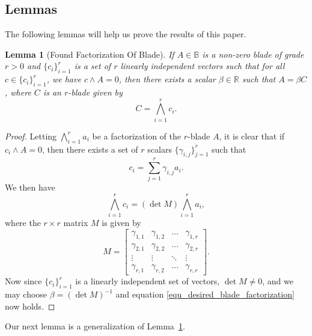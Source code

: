 \documentclass{birkjour}
\newtheorem{lem}[thm]{Lemma}
\theoremstyle{definition}
\theoremstyle{remark}
\numberwithin{equation}{section}
\newcommand{\R}{\mathbb{R}}
\newcommand{\B}{\mathbb{B}}
\begin{document}
\subsection{Lemmas}

The following lemmas will help us prove the results of this paper.

\begin{lem}[Found Factorization Of Blade]\label{lem_desired_blade_factorization}
If $A\in\B$ is a non-zero blade of grade $r>0$ and $\{c_i\}_{i=1}^r$ is a set
of $r$ linearly independent vectors such that for all $c\in\{c_i\}_{i=1}^r$, we have
$c\wedge A=0$, then there exists a scalar $\beta\in\R$ such that $A=\beta C$,
where $C$ is an $r$-blade given by
\begin{equation}\label{equ_desired_blade_factorization}
C=\bigwedge_{i=1}^r c_i.
\end{equation}
\end{lem}
\begin{proof}
Letting $\bigwedge_{i=1}^r a_i$ be a factorization of the $r$-blade $A$, it is clear
that if $c_i\wedge A=0$, then there exists a set of $r$ scalars $\{\gamma_{i,j}\}_{j=1}^r$
such that
\begin{equation}\label{equ_c_i}
c_i=\sum_{j=1}^r\gamma_{i,j}a_i.
\end{equation}
We then have
\begin{equation}
\bigwedge_{i=1}^r c_i=(\det M)\bigwedge_{i=1}^r a_i,
\end{equation}
where the $r\times r$ matrix $M$ is given by
\begin{equation}
M = \left[\begin{array}{cccc}
\gamma_{1,1} & \gamma_{1,2} & \dots & \gamma_{1,r} \\
\gamma_{2,1} & \gamma_{2,2} & \dots & \gamma_{2,r} \\
\vdots & \vdots & \ddots & \vdots \\
\gamma_{r,1} & \gamma_{r,2} & \dots & \gamma_{r,r}
\end{array}\right].
\end{equation}
Now since $\{c_i\}_{i=1}^r$ is a linearly independent set of vectors,
$\det M\neq 0$, and we may choose $\beta=(\det M)^{-1}$ and
equation \eqref{equ_desired_blade_factorization} now holds.
\end{proof}

Our next lemma is a generalization of Lemma~\ref{lem_desired_blade_factorization}.
\end{document}
